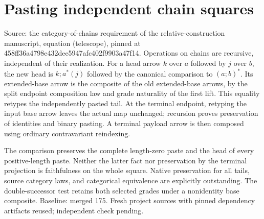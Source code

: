 \documentclass{article}
\begin{document}
\section*{Pasting independent chain squares}
Source: the category-of-chains requirement of the relative-construction manuscript, equation (telescope), pinned at 458ff36a4798e432dee5947afc402f9903a47f14. Operations on chains are recursive, independent of their realization. For a head arrow $k$ over $a$ followed by $j$ over $b$, the new head is $k;a^*(j)$ followed by the canonical comparison to $(a;b)^*$. Its extended-base arrow is the composite of the old extended-base arrows, by the split endpoint composition law and grade naturality of the first lift. This equality retypes the independently pasted tail. At the terminal endpoint, retyping the input base arrow leaves the actual map unchanged; recursion proves preservation of identities and binary pasting. A terminal payload arrow is then composed using ordinary contravariant reindexing.

The comparison preserves the complete length-zero paste and the head of every positive-length paste. Neither the latter fact nor preservation by the terminal projection is faithfulness on the whole square. Native preservation for all tails, source category laws, and categorical equivalence are explicitly outstanding. The double-successor test retains both selected grades under a nonidentity base composite. Baseline: merged 175. Fresh project sources with pinned dependency artifacts reused; independent check pending.
\end{document}
